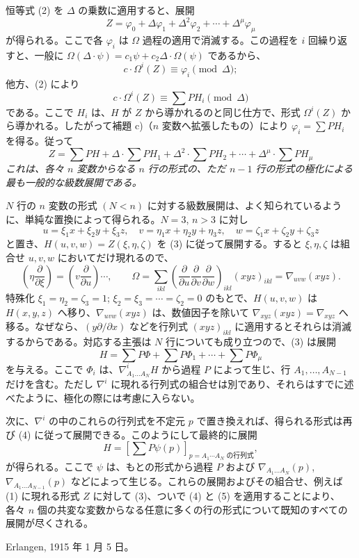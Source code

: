 恒等式 (2) を $\Delta$ の乗数に適用すると、展開
\[
  Z=\varphi_0+\Delta\varphi_1+\Delta^2\varphi_2+\cdots+\Delta^\mu\varphi_\mu
\]
が得られる。ここで各 $\varphi_i$ は $\Omega$ 過程の適用で消滅する。この過程を $i$ 回繰り返すと、一般に $\Omega(\Delta\cdot\psi)=c_1\psi+c_2\Delta\cdot\Omega(\psi)$ であるから、
\[
  c\cdot \Omega^i(Z)\equiv\varphi_i\pmod{\Delta};
\]
他方、(2) により
\[
  c\cdot\Omega^i(Z)\equiv\sum PH_i\pmod{\Delta}
\]
である。ここで $H_i$ は、$H$ が $Z$ から導かれるのと同じ仕方で、形式 $\Omega^i(Z)$ から導かれる。したがって補題 c)（$n$ 変数へ拡張したもの）により $\varphi_i=\sum PH_i$ を得る。従って
\begin{equation}
  Z=\sum PH+\Delta\cdot\sum PH_1+\Delta^2\cdot\sum PH_2+
  \cdots+\Delta^\mu\cdot\sum PH_\mu
\tag{3}
\end{equation}
\emph{これは、各々 $n$ 変数からなる $n$ 行の形式の、ただ $n-1$ 行の形式の極化による最も一般的な級数展開である。}

$N$ 行の $n$ 変数の形式 $(N<n)$ に対する級数展開は、よく知られているように、単純な置換によって得られる。$N=3$, $n>3$ に対し
\[
  u=\xi_1x+\xi_2y+\xi_3z,
  \quad v=\eta_1x+\eta_2y+\eta_3z,
  \quad w=\zeta_1x+\zeta_2y+\zeta_3z
\]
と置き、$H(u,v,w)=Z(\xi,\eta,\zeta)$ を (3) に従って展開する。すると $\xi,\eta,\zeta$ は組合せ $u,v,w$ においてだけ現れるので、
\[
  \left(\eta\frac{\partial}{\partial \xi}\right)=
  \left(v\frac{\partial}{\partial u}\right)\cdots,
  \qquad
  \Omega=\sum_{ikl}\left(\frac{\partial}{\partial u}
  \frac{\partial}{\partial v}
  \frac{\partial}{\partial w}\right)_{ikl}(xyz)_{ikl}
  =\nabla_{uvw}(xyz).
\]
特殊化 $\xi_1=\eta_2=\zeta_3=1$; $\xi_2=\xi_3=\cdots=\zeta_2=0$ のもとで、$H(u,v,w)$ は $H(x,y,z)$ へ移り、$\nabla_{uvw}(xyz)$ は、数値因子を除いて $\nabla_{xyz}(xyz)=\nabla_{xyz}$ へ移る。なぜなら、$(y\partial/\partial x)$ などを行列式 $(xyz)_{ikl}$ に適用するとそれらは消滅するからである。対応する主張は $N$ 行についても成り立つので、(3) は展開
\begin{equation}
  H=\sum P\Phi+\sum P\Phi_1+\cdots+\sum P\Phi_\mu
\tag{4}
\end{equation}
を与える。ここで $\Phi_i$ は、$\nabla^i_{A_1\ldots A_N}H$ から過程 $P$ によって生じ、行 $A_1,
\ldots,A_{N-1}$ だけを含む。ただし $\nabla^i$ に現れる行列式の組合せは別であり、それらはすでに述べたように、極化の際には考慮に入らない。

次に、$\nabla^i$ の中のこれらの行列式を不定元 $p$ で置き換えれば、得られる形式は再び (4) に従って展開できる。このようにして最終的に展開
\begin{equation}
  H=\left[\sum P\psi(p)\right]_{p=\text{$A_1\cdots A_N$ の行列式}},
\tag{5}
\end{equation}
が得られる。ここで $\psi$ は、もとの形式から過程 $P$ および $\nabla_{A_1\ldots A_N}(p)$, $\nabla_{A_1\ldots A_{N-1}}(p)$ などによって生じる。これらの展開およびその組合せ、例えば (1) に現れる形式 $Z$ に対して (3)、ついで (4) と (5) を適用することにより、各々 $n$ 個の共変な変数からなる任意に多くの行の形式について既知のすべての展開が尽くされる。

Erlangen, 1915 年 1 月 5 日。

\clearpage
